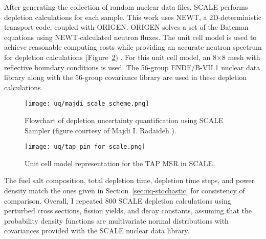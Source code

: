 After generating the collection of random nuclear data files, SCALE performs 
depletion calculations for each sample. This work uses NEWT, a
2D-deterministic transport code, coupled with ORIGEN. ORIGEN solves a set of 
the Bateman equations using NEWT-calculated neutron fluxes. The unit cell 
model is used to achieve reasonable computing costs while providing an 
accurate neutron spectrum for depletion calculations 
(Figure~\ref{fig:uq-tap-pincell}) \cite{betzler_molten_2017, 
rykhlevskii_fuel_2019, betzler_modeling_2020}. For this unit cell model, an 
8$\times$8 mesh with reflective boundary conditions is used. The 56-group 
ENDF/B-VII.1 nuclear data library along with the 56-group covariance library 
are used in these depletion calculations. 
\begin{figure}[htp!] %
	\centering
	\texttt{[image: uq/majdi\_scale\_scheme.png]}
	\caption{Flowchart of depletion uncertainty quantification 
		using SCALE Sampler (figure courtesy of Majdi I. Radaideh 
		\cite{radaideh_novel_2019}).}
	\label{fig:uq-sampler}
\end{figure}
	\vspace{-7mm}
\begin{figure}[hbp!] %
	\centering
	\texttt{[image: uq/tap\_pin\_for\_scale.png]}
	\caption{Unit cell model representation for the \gls{TAP} \gls{MSR} in 
	SCALE.}
	\label{fig:uq-tap-pincell}
\end{figure}

The fuel salt composition, total depletion time, depletion time steps, and 
power density match the ones given in Section~\ref{sec:uq-stochastic} for 
consistency of comparison. Overall, I repeated 800 SCALE depletion 
calculations using perturbed cross sections, fission yields, and decay 
constants, assuming that the probability density functions are multivariate 
normal distributions with covariances provided with the SCALE nuclear data 
library.



